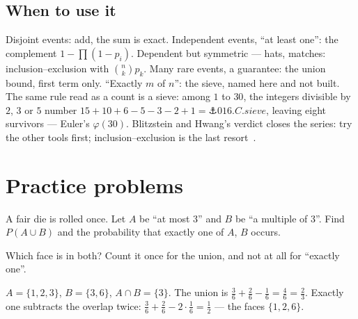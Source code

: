 \begin{narrative}
\section{When to use it}

Disjoint events: add, the sum is exact. Independent events, ``at
least one'': the complement $1 - \prod (1 - p_i)$. Dependent but
symmetric — hats, matches: inclusion–exclusion with
$\binom{n}{k} p_k$. Many rare events, a guarantee: the union bound,
first term only. ``Exactly $m$ of $n$'': the sieve, named here and
not built. The same rule read as a count is a sieve: among $1$ to
$30$, the integers divisible by $2$, $3$ or $5$ number $15 + 10 + 6 -
5 - 3 - 2 + 1 = \anchor{016.C.sieve}$, leaving eight survivors —
Euler's $\varphi(30)$. Blitzstein and Hwang's verdict closes the
series: try the other tools first; inclusion–exclusion is the last
resort~\cite{probability-blitzstein-hwang-introduction-to-probability-chs-1-2-excerpt}.
\end{narrative}

\section*{Practice problems}

\begin{problem}
A fair die is rolled once. Let $A$ be ``at most $3$'' and $B$ be ``a
multiple of $3$''. Find $P(A \cup B)$ and the probability that exactly
one of $A$, $B$ occurs.
\begin{hint}
Which face is in both? Count it once for the union, and not at all for
``exactly one''.
\end{hint}
\begin{solution}
$A = \{1,2,3\}$, $B = \{3,6\}$, $A \cap B = \{3\}$. The union is
$\tfrac36 + \tfrac26 - \tfrac16 = \tfrac46 = \tfrac23$. Exactly one
subtracts the overlap twice: $\tfrac36 + \tfrac26 - 2\cdot\tfrac16 =
\tfrac12$ — the faces $\{1, 2, 6\}$.
\end{solution}
\end{problem}

